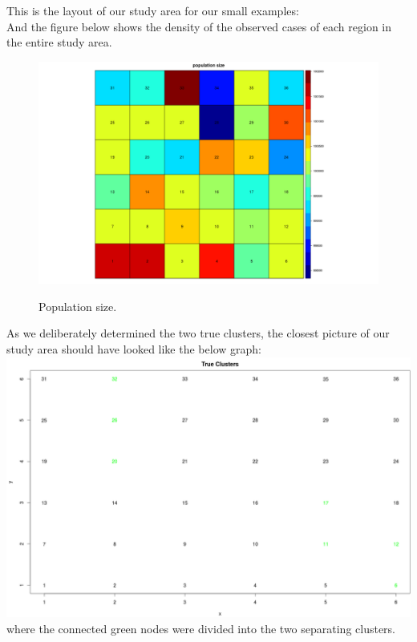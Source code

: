 \documentclass[12pt]{article}
\begin{document}
	This is the layout of our study area for our small examples:\\
		
	
	And the figure below shows the density of the observed cases of each region in the entire study area.\\
	
	\begin{figure}[!ht]
		
		\centering
		\includegraphics[scale=0.2]{Population}\\
		\caption{Population size.\label{f:gull}}
		
	\end{figure}
	
	
	As we deliberately determined the two true clusters, the closest picture of our study area should have looked like the below graph: \\
	
	\includegraphics[scale=0.25]{true_clusters}\\ where the connected green nodes were divided into the two separating clusters. \\
	
\end{document}
